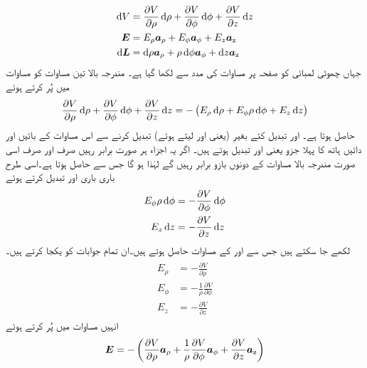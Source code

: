 \begin{align}
\dif V&=\frac{\partial V}{\partial \rho} \dif \rho+\frac{\partial V}{\partial \phi} \dif \phi +\frac{\partial V}{\partial z} \dif z \label{مساوات_توانائی_دباو_نلکی_تفرق}\\
\kvec{E}&=E_\rho \arho+ E_\phi \aphi+E_z \az \label{مساوات_توانائی_نلکی_میدان}\\
\dif \kvec{L}&=\dif \rho \arho+\rho \dif \phi \aphi+\dif z \az \label{مساوات_توانائی_نلکی_چھوٹا_فاصلہ}
\end{align}
جہاں چھوٹی لمبائی  کو صفحہ  پر مساوات  کی مدد سے لکھا گیا ہے۔
مندرجہ بالا تین مساوات کو مساوات  میں پُر کرتے ہوئے
\begin{align}
\frac{\partial V}{\partial \rho} \dif \rho+\frac{\partial V}{\partial \phi} \dif \phi +\frac{\partial V}{\partial z} \dif z=-\left(E_\rho \dif \rho+E_\phi \rho \dif \phi+E_z \dif z\right)
\end{align}
حاصل ہوتا ہے۔ اور  تبدیل کئے بغیر (یعنی  اور  لیتے ہوئے)  تبدیل کرنے سے  اس مساوات کے بائیں اور دائیں ہاتھ کا پہلا جزو یعنی  اور   تبدیل ہوتے ہیں۔ اگر یہ اجزاء ہر صورت برابر رہیں صرف اور صرف اسی صورت مندرجہ بالا مساوات کے دونوں بازو برابر رہیں گے لہٰذا  ہو گا جس سے  حاصل ہوتا ہے۔اسی طرح باری باری  اور  تبدیل کرتے ہوئے
\begin{align*}
E_\phi \rho \dif \phi&=-\frac{\partial V}{\partial \phi} \dif \phi\\
E_z \dif z&=-\frac{\partial V}{\partial z} \dif z
\end{align*}
لکھے جا سکتے ہیں جس سے  اور  کے مساوات حاصل ہوتے ہیں۔ان تمام جوابات کو یکجا کرتے ہیں۔
\begin{gather}
\begin{aligned}
E_\rho&=-\frac{\partial V}{\partial \rho}\\
E_\phi &=-\frac{1}{\rho}\frac{\partial V}{\partial \phi} \\
E_z &=-\frac{\partial V}{\partial z} 
\end{aligned}
\end{gather}
انہیں مساوات  میں پُر کرتے ہوئے
\begin{align}
{\ensuremath{{\boldsymbol{E}}}}=-\left( \frac{\partial V}{\partial \rho} {\boldsymbol{a}}_{\rho}+\frac{1}{\rho}\frac{\partial V}{\partial \phi}  {\boldsymbol{a}}_{\phi}+\frac{\partial V}{\partial z}{\boldsymbol{a}}_{\textup{z}} \right)
\end{align}
